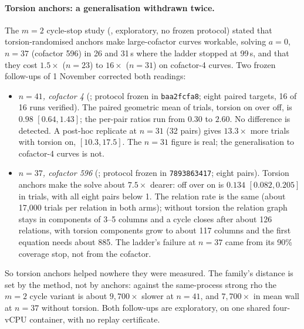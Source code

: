 \paragraph{Torsion anchors: a generalisation withdrawn twice.} The $m=2$
cycle-stop study (,
exploratory, no frozen protocol) stated that torsion-randomised anchors
make large-cofactor curves workable, solving $a=0$, $n=37$ (cofactor 596)
in 26 and 31\,s where the ladder stopped at 99\,s, and that they cost
$1.5\times$ ($n=23$) to $16\times$ ($n=31$) on cofactor-4 curves. Two frozen
follow-ups of 1 November corrected both readings:
\begin{itemize}
\item \emph{$n=41$, cofactor 4}
  (; protocol frozen in
  \texttt{baa2fcfa8}; eight paired targets, 16 of 16 runs verified). The
  paired geometric mean of trials, torsion on over off, is $0.98$
  $[0.64,1.43]$; the per-pair ratios run from $0.30$ to $2.60$. No
  difference is detected. A post-hoc replicate at $n=31$ (32 pairs) gives
  $13.3\times$ more trials with torsion on, $[10.3,17.5]$. The $n=31$ figure
  is real; the generalisation to cofactor-4 curves is not.
\item \emph{$n=37$, cofactor 596}
  (; protocol frozen in
  \texttt{7893863417}; eight pairs). Torsion anchors make the solve about
  $7.5\times$ dearer: off over on is $0.134$ $[0.082,0.205]$ in trials, with
  all eight pairs below 1. The relation rate is the same (about 17{,}000
  trials per relation in both arms); without torsion the relation graph
  stays in components of 3--5 columns and a cycle closes after about 126
  relations, with torsion components grow to about 117 columns and the
  first equation needs about 885. The ladder's failure at $n=37$ came from
  its 90\% coverage stop, not from the cofactor.
\end{itemize}
So torsion anchors helped nowhere they were measured. The family's
distance is set by the method, not by anchors: against the same-process
strong rho the $m=2$ cycle variant is about $9{,}700\times$ slower at
$n=41$, and $7{,}700\times$ in mean wall at $n=37$ without torsion. Both
follow-ups are exploratory, on one shared four-vCPU container, with no
replay certificate.

